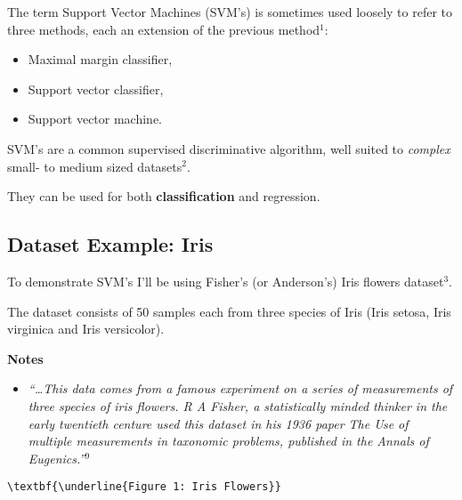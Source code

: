 \documentclass[11pt]{article}
\providecommand{\tightlist}{%
      \setlength{\itemsep}{0pt}\setlength{\parskip}{0pt}}
\begin{document}
The term Support Vector Machines (SVM's) is sometimes used loosely to
refer to three methods, each an extension of the previous method\(^1\):

\begin{itemize}
\tightlist
\item
  Maximal margin classifier,
\item
  Support vector classifier,
\item
  Support vector machine.
\end{itemize}

SVM's are a common supervised discriminative algorithm, well suited to
\emph{complex} small- to medium sized datasets\(^2\).

They can be used for both \textbf{classification} and regression.

    \hypertarget{dataset-example-iris}{%
\subsection{\texorpdfstring{Dataset Example: Iris
}{Dataset Example: Iris }}\label{dataset-example-iris}}

To demonstrate SVM's I'll be using Fisher's (or Anderson's) Iris flowers
dataset\(^3\).

The dataset consists of 50 samples each from three species of Iris (Iris
setosa, Iris virginica and Iris versicolor).

    \textbf{Notes}

\begin{itemize}
\tightlist
\item
  \emph{``\ldots This data comes from a famous experiment on a series of
  measurements of three species of iris flowers. R A Fisher, a
  statistically minded thinker in the early twentieth centure used this
  dataset in his 1936 paper The Use of multiple measurements in
  taxonomic problems, published in the Annals of Eugenics.''}\(^9\)
\end{itemize}

    \begin{Verbatim}[commandchars=\\\{\}]
\textbf{\underline{Figure 1: Iris Flowers}}
    \end{Verbatim}

    \begin{center}
    \end{center}
    { \hspace*{\fill} \\}
    
\end{document}
